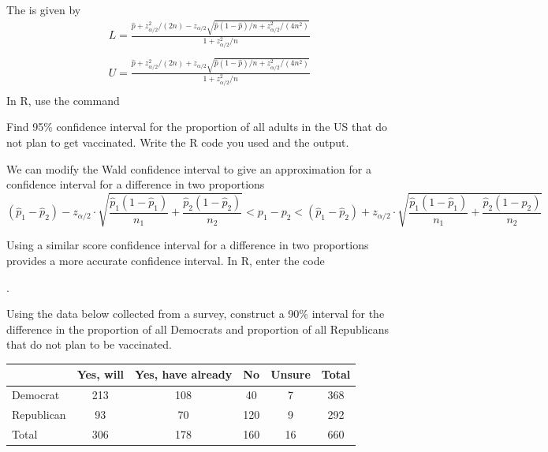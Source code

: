 \clearpage

\bbox
The \textbf{} is given by
\begin{align*}
&L= \frac{\hat{p} + z_{\alpha/2}^2/(2n) - z_{\alpha/2} \sqrt{\hat{p}(1-\hat{p})/n+z_{\alpha/2}^2/(4n^2)}}{1+z_{\alpha/2}^2/n} \\
\\
&U= \frac{\hat{p} + z_{\alpha/2}^2/(2n) + z_{\alpha/2} \sqrt{\hat{p}(1-\hat{p})/n+z_{\alpha/2}^2/(4n^2)}}{1+z_{\alpha/2}^2/n} \\
\end{align*}
In R, use the command \textbf{}
\ebox

\bb[resume]
\ii Find 95\% confidence interval for the proportion of all adults in the US that do not plan to get vaccinated.
Write the R code you used and the output.
\ee

\clearpage
{}

\bbox
We can modify the Wald confidence interval to give an approximation for a confidence interval for a difference in two proportions
\[ (\hat{p}_1 - \hat{p}_2) - z_{\alpha/2} \cdot \sqrt{ \frac{\hat{p}_1(1-\hat{p}_1)}{n_1} + \frac{\hat{p}_2(1-\hat{p}_2)}{n_2}}  < p_1-p_2 < (\hat{p}_1 - \hat{p}_2) + z_{\alpha/2} \cdot \sqrt{ \frac{\hat{p}_1(1-\hat{p}_1)}{n_1} + \frac{\hat{p}_2(1-\hat{p}_2)}{n_2}}  \]
\ebox

\bbox
Using a similar score confidence interval for a difference in two proportions provides a more accurate confidence interval. In R, enter the code\\
\begin{center} \textbf{}.\end{center}
\ebox

\bb[resume]
\ii Using the data below collected from a survey, construct a 90\% interval for the difference in the proportion of all Democrats and proportion of all Republicans that do not plan to be vaccinated.

\begin{center}
\begin{tabular}{l||c|c|c|c||c}
 & Yes, will & Yes, have already & No & Unsure & Total\\
\hline
Democrat & 213 & 108  & 40 & 7  & 368\\
\hline
Republican & 93 & 70 & 120  & 9 & 292\\
\hline
Total & 306 & 178 & 160 & 16 & 660\\
\end{tabular}
\end{center}
\ee
